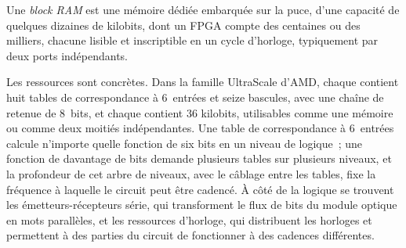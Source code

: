 \begin{definition}\label{def:nw:programmable-hardware-i-architecture-and-toolchain:bram}
Une \emph{block RAM} est une mémoire dédiée embarquée sur la puce, d'une capacité de quelques dizaines de kilobits, dont un FPGA compte des centaines ou
des milliers, chacune lisible et inscriptible en un cycle d'horloge, typiquement par deux ports indépendants.
\end{definition}

Les ressources sont concrètes. Dans la famille UltraScale d'AMD, chaque  contient huit tables de correspondance à 6~entrées et seize
bascules, avec une chaîne de retenue de 8~bits, et chaque  contient 36 kilobits, utilisables comme une mémoire ou comme deux moitiés indépendantes. Une table de correspondance à 6~entrées
calcule n'importe quelle fonction de six bits en un niveau de logique~; une fonction de davantage de bits demande plusieurs tables sur plusieurs niveaux,
et la profondeur de cet arbre de niveaux, avec le câblage entre les tables, fixe la fréquence à laquelle le circuit peut être cadencé. À côté de la logique
se trouvent les émetteurs-récepteurs série, qui transforment le flux de bits du module optique en mots parallèles, et les ressources d'horloge, qui
distribuent les horloges et permettent à des parties du circuit de fonctionner à des cadences différentes.

